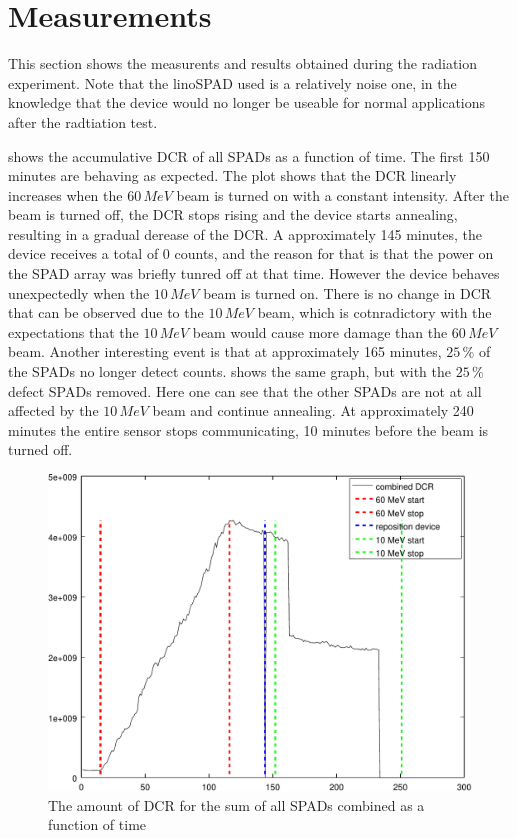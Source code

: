 \section{Measurements}\label{ssec:results}
This section shows the measurents and results obtained during the radiation experiment. Note that the linoSPAD used is a relatively noise one, in the knowledge that the device  would no longer be useable for normal applications after the radtiation test.

 shows the accumulative DCR of all SPADs as a function of time. The first 150 minutes are behaving as expected. The plot shows that the DCR linearly increases when the $60\,MeV$ beam  is turned on with a constant intensity. After the beam is turned off, the DCR stops rising and the device starts annealing, resulting in a gradual derease of the DCR. A approximately 145 minutes, the device receives a total of 0 counts, and the reason for that is that the power on the SPAD array was briefly tunred off at that time. However the device behaves unexpectedly when the $10\,MeV$ beam is turned on. There is no change in DCR that can be observed due to the $10\,MeV$ beam, which is cotnradictory with the expectations that the $10\,MeV$ beam would cause more damage than the $60\,MeV$ beam. Another interesting event is that at approximately 165 minutes, $25\,\%$ of the SPADs no longer detect counts.  shows the same graph, but with the $25\,\%$ defect SPADs removed. Here one can see that the other SPADs are not at all affected by the $10\,MeV$ beam and continue annealing. At approximately 240 minutes the entire sensor stops communicating, 10 minutes before the beam is turned off.



\begin{figure}[h]
\centering
	\includegraphics[width=0.6\linewidth]{fig/count_vs_time_sum_all.pdf}
\caption{The amount of DCR for the sum of all SPADs combined as a function of time}
\label{fig:count_vs_time_sum_all}
\end{figure}


